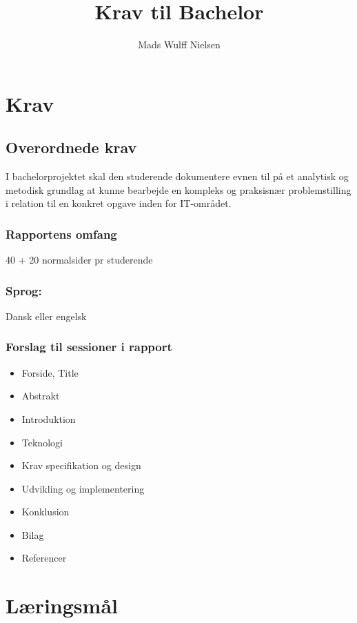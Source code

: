 \documentclass[11pt]{article}
\begin{document}
\begin{titlepage}
\title{Krav til Bachelor}
\author{Mads Wulff Nielsen }
\maketitle
\thispagestyle{empty} %
\end{titlepage}
\tableofcontents
\thispagestyle{empty}
\clearpage
\section{Krav}
\subsection{Overordnede krav} 
I bachelorprojektet skal den studerende dokumentere evnen til på et
analytisk og metodisk grundlag at kunne bearbejde en kompleks og praksisnær
problemstilling i relation til en konkret opgave inden for IT-området.
\subsubsection{Rapportens omfang} 
40 + 20 normalsider pr studerende
\subsubsection{Sprog:} Dansk eller engelsk
\subsubsection{Forslag til sessioner i rapport}
\begin{itemize}
\item Forside, Title
\item Abstrakt
\item Introduktion
\item Teknologi
\item Krav specifikation og design
\item Udvikling og implementering
\item Konklusion
\item Bilag
\item Referencer
\end{itemize}
\clearpage

\section{Læringsmål}
\end{document}
